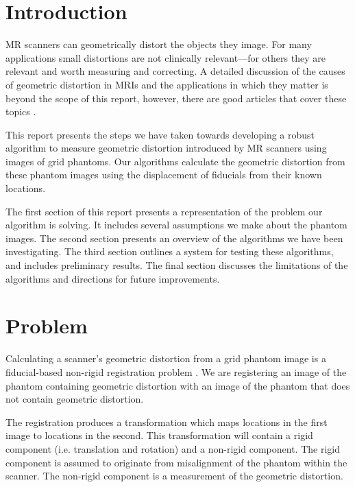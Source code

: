 \documentclass[12pt]{article}
\begin{document}
\maketitle

\section*{Introduction}
MR scanners can geometrically distort the objects they image.  For many applications small distortions are not clinically relevant---for others they are relevant and worth measuring and correcting.  A detailed discussion of the causes of geometric distortion in MRIs and the applications in which they matter is beyond the scope of this report, however, there are good articles that cover these topics \cite{baldwin2007,torfeh2015,wang2005,mribook}.  

This report presents the steps we have taken towards developing a robust algorithm to measure geometric distortion introduced by MR scanners using images of grid phantoms.  Our algorithms calculate the geometric distortion from these phantom images using the displacement of fiducials from their known locations.

The first section of this report presents a representation of the problem our algorithm is solving.  It includes several assumptions we make about the phantom images.  The second section presents an overview of the algorithms we have been investigating.  The third section outlines a system for testing these algorithms, and includes preliminary results.  The final section discusses the limitations of the algorithms and directions for future improvements.

\section*{Problem}
Calculating a scanner's geometric distortion from a grid phantom image is a fiducial-based non-rigid registration problem \cite{hill2001}.  We are registering an image of the phantom containing geometric distortion with an image of the phantom that does not contain geometric distortion.

The registration produces a transformation which maps locations in the first image to locations in the second.  This transformation will contain a rigid component (i.e. translation and rotation) and a non-rigid component.  The rigid component is assumed to originate from misalignment of the phantom within the scanner.  The non-rigid component is a measurement of the geometric distortion.
\end{document}

